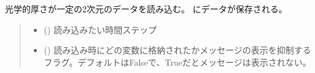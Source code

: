 \documentclass[letterpaper,10pt,dvipdfmx,report]{sphinxmanual}
\begin{document}
\begin{fulllineitems}
\label{\detokenize{io:R2D2.R2D2_data.read_qq_tau}}
\pysigstartsignatures
{}
\pysigstopsignatures
\sphinxAtStartPar
光学的厚さが一定の2次元のデータを読み込む。{\hyperref[\detokenize{io:R2D2.R2D2_data.qt}]{}} にデータが保存される。
\begin{quote}\begin{description}
\begin{itemize}
\item {} 
\sphinxAtStartPar
{} () \sphinxhyphen{}\sphinxhyphen{} 読み込みたい時間ステップ

\item {} 
\sphinxAtStartPar
{} () \sphinxhyphen{}\sphinxhyphen{} 読み込み時にどの変数に格納されたかメッセージの表示を抑制するフラグ。デフォルトはFalseで、Trueだとメッセージは表示されない。

\end{itemize}

\end{description}\end{quote}

\end{fulllineitems}

\end{document}
